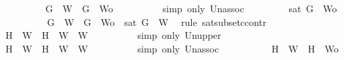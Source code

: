 \begin{isabellebody}
\ \ \ \ \ \ \isamarkupfalse%
\ \isamarkupfalse%
\ {\isachardoublequoteopen}{\isacharbraceleft}G{\isacharbraceright}\ {\isasymunion}\ W{}\ {\isasymsubseteq}\ {\isacharbraceleft}G{\isacharbraceright}\ {\isasymunion}\ {\isacharquery}Wo{\isachardoublequoteclose}\isanewline
\ \ \ \ \ \ \ \ \isamarkupfalse%
\ {\isacharparenleft}simp\ only{\isacharcolon}\ Un{\isacharunderscore}assoc{\isacharparenright}\isanewline
\ \ \ \ \ \ \isamarkupfalse%
\ {\isachardoublequoteopen}{\isasymnot}\ sat\ {\isacharparenleft}{\isacharbraceleft}G{\isacharbraceright}\ {\isasymunion}\ {\isacharquery}Wo{\isacharparenright}{\isachardoublequoteclose}\isanewline
\ \ \ \ \ \ \ \ \isamarkupfalse%
\ {\isacartoucheopen}{\isacharbraceleft}G{\isacharbraceright}\ {\isasymunion}\ W{}\ {\isasymsubseteq}\ {\isacharbraceleft}G{\isacharbraceright}\ {\isasymunion}\ {\isacharquery}Wo{\isacartoucheclose}\ {\isacartoucheopen}{\isasymnot}\ sat\ {\isacharparenleft}{\isacharbraceleft}G{\isacharbraceright}\ {\isasymunion}\ W{}{\isacharparenright}{\isacartoucheclose}\ \isamarkupfalse%
\ {\isacharparenleft}rule\ sat{\isacharunderscore}subset{\isacharunderscore}ccontr{\isacharparenright}\isanewline
\ \ \ \ \ \ \isamarkupfalse%
\ {\isachardoublequoteopen}{\isacharbraceleft}H{\isacharbraceright}\ {\isasymunion}\ W{}\ {\isasymsubseteq}\ {\isacharparenleft}{\isacharbraceleft}H{\isacharbraceright}\ {\isasymunion}\ W{}{\isacharparenright}\ {\isasymunion}\ W{}{\isachardoublequoteclose}\isanewline
\ \ \ \ \ \ \ \ \isamarkupfalse%
\ {\isacharparenleft}simp\ only{\isacharcolon}\ Un{\isacharunderscore}upper{}{\isacharparenright}\isanewline
\ \ \ \ \ \ \isamarkupfalse%
\ \isamarkupfalse%
\ {\isachardoublequoteopen}{\isacharbraceleft}H{\isacharbraceright}\ {\isasymunion}\ W{}\ {\isasymsubseteq}\ {\isacharbraceleft}H{\isacharbraceright}\ {\isasymunion}\ {\isacharparenleft}W{}\ {\isasymunion}\ W{}{\isacharparenright}{\isachardoublequoteclose}\isanewline
\ \ \ \ \ \ \ \ \isamarkupfalse%
\ {\isacharparenleft}simp\ only{\isacharcolon}\ Un{\isacharunderscore}assoc{\isacharparenright}\ \isanewline
\ \ \ \ \ \ \isamarkupfalse%
\ \isamarkupfalse%
\ {\isachardoublequoteopen}{\isacharbraceleft}H{\isacharbraceright}\ {\isasymunion}\ W{}\ {\isasymsubseteq}\ {\isacharbraceleft}H{\isacharbraceright}\ {\isasymunion}\ {\isacharquery}Wo{\isachardoublequoteclose}\isanewline

\end{isabellebody}
